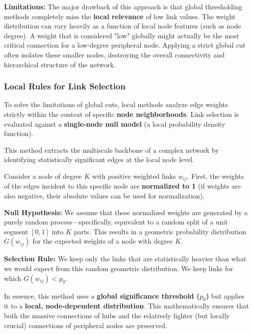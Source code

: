 \textbf{Limitations:}
The major drawback of this approach is that global thresholding methods completely miss the \textbf{local relevance} of low link values. The weight distribution can vary heavily as a function of local node features (such as node degree). A weight that is considered "low" globally might actually be the most critical connection for a low-degree peripheral node. Applying a strict global cut often isolates these smaller nodes, destroying the overall connectivity and hierarchical structure of the network.

\subsubsection{Local Rules for Link Selection}
To solve the limitations of global cuts, local methods analyze edge weights strictly within the context of specific \textbf{node neighborhoods}. Link selection is evaluated against a \textbf{single-node null model} (a local probability density function).

\begin{example}
    This method extracts the multiscale backbone of a complex network by identifying statistically significant edges at the local node level.

    Consider a node of degree $K$ with positive weighted links $w_{ij}$. First, the weights of the edges incident to this specific node are \textbf{normalized to 1} (if weights are also negative, their absolute values can be used for normalization).

    \textbf{Null Hypothesis:} We assume that these normalized weights are generated by a purely random process—specifically, equivalent to a random split of a unit segment $[0,1]$ into $K$ parts. This results in a geometric probability distribution $G(w_{ij})$ for the expected weights of a node with degree $K$.

    \textbf{Selection Rule:} We keep only the links that are statistically heavier than what we would expect from this random geometric distribution. We keep links for which $G(w_{ij}) < p_0$.

    In essence, this method uses a \textbf{global significance threshold ($p_0$)} but applies it to a \textbf{local, node-dependent distribution}. This mathematically ensures that both the massive connections of hubs and the relatively lighter (but locally crucial) connections of peripheral nodes are preserved.
\end{example}

